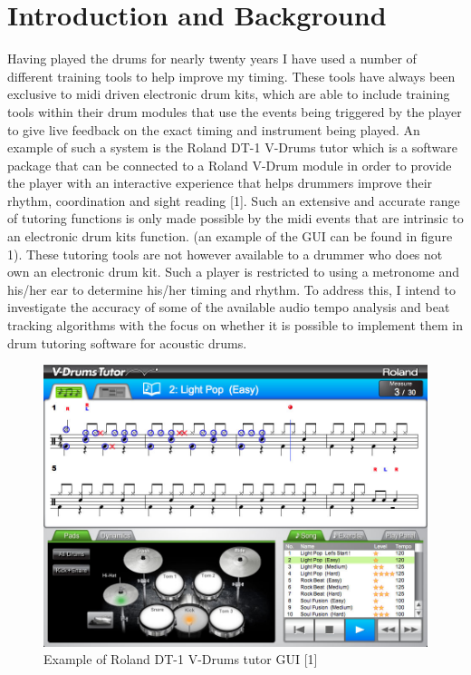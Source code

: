 \documentclass[a4paper, 11pt]{article}
\begin{document}
\maketitle{} \section{Introduction and Background}
Having played the drums for nearly twenty years I have used a number of different training tools to help improve my timing. These tools have always been exclusive to midi driven electronic drum kits, which are able to include training tools within their drum modules that use the events being triggered by the player to give live feedback on the exact timing and instrument being played. An example of such a system is the Roland DT-1 V-Drums tutor which is a software package that can be connected to a Roland V-Drum module in order to provide the player with an interactive experience that helps drummers improve their rhythm, coordination and sight reading [1]. Such an extensive and accurate range of tutoring functions is only made possible by the midi events that are intrinsic to an electronic drum kits function. (an example of the GUI can be found in figure 1). These tutoring tools are not however available to a drummer who does not own an electronic drum kit. Such a player is restricted to using a metronome and his/her ear to determine his/her timing and rhythm. To address this, I intend to investigate the accuracy of some of the available audio tempo analysis and beat tracking algorithms with the focus on whether it is possible to implement them in drum tutoring software for acoustic drums.
\begin{figure}[h]
\caption{Example of Roland DT-1 V-Drums tutor GUI [1]}
	\centering
	\includegraphics[scale=0.25]{dt-1_ss_main_notation_gal}
\end{figure}
\end{document}
